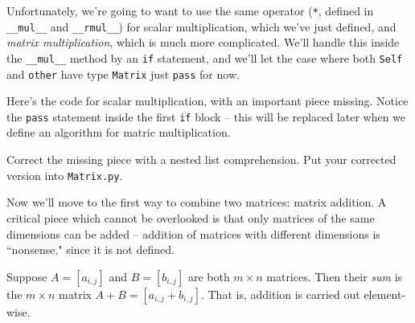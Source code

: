 \documentclass[m3380-lec-main.tex]{subfiles}
\begin{document}
Unfortunately, we're going to want to use the same operator (\verb|*|, defined in \verb|__mul__| and \verb|__rmul__|) for scalar multiplication, which we've just defined, and \emph{matrix multiplication}, which is much more complicated. We'll handle this inside the \verb|__mul__| method by an \verb|if| statement, and we'll let the case where both \verb|Self| and \verb|other| have type \verb|Matrix| just \verb|pass| for now.

\begin{exc} Here's the code for scalar multiplication, with an important piece missing. Notice the \verb|pass| statement inside the first \verb|if| block -- this will be replaced later when we define an algorithm for matric multiplication. 

\smallskip\noindent
Correct the missing piece with a nested list comprehension. Put your corrected version into \verb|Matrix.py|.
\end{exc}

Now we'll move to the first way to combine two matrices: matrix addition. A critical piece which cannot be overlooked is that only matrices of the same dimensions can be added -- addition of matrices with different dimensions is ``nonsense," since it is not defined.

\begin{defn} Suppose $A=[a_{i,j}]$ and $B=[b_{i,j}]$ are both $m\times n$ matrices. Then their \emph{sum} is the $m\times n$ matrix $A+B = [a_{i,j}+b_{i,j}]$. That is, addition is carried out element-wise.
\end{defn}
\end{document}
